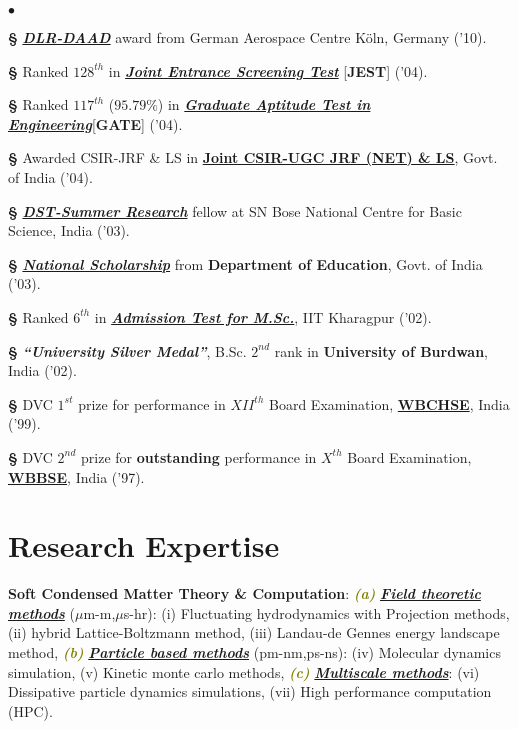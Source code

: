 \documentclass[margin,line]{res}
\newenvironment{list2}{
  \begin{list}{$\bullet$}{%
      \setlength{\itemsep}{0in}
      \setlength{\parsep}{0in} \setlength{\parskip}{0in}
      \setlength{\topsep}{0in} \setlength{\partopsep}{0in} 
      \setlength{\leftmargin}{0.2in}}}{\end{list}}
\begin{document}
\begin{resume}
\begin{list2}
\item[{\bf \S}] \href{https://www.daad.de/deutschland/stipendium/datenbank/en/15370-dlr-daad-research-fellowships-in-the-fields-of-space-aeronautics-energy-and-transportation-research/}{\textit{\textbf{DLR-DAAD}}} award from German Aerospace Centre K\"{o}ln, Germany ('10).
\item[{\bf \S}] Ranked {$128^{th}$} in \href{https://www.jest.org.in/}{\textit{\textbf{Joint Entrance Screening Test}}} [{\bf JEST}] ('04).
\item[{\bf \S}] Ranked {$117^{th}$} ($95.79\%$) in \href{https://en.wikipedia.org/wiki/Graduate_Aptitude_Test_in_Engineering}{\textit{\textbf{Graduate Aptitude Test in Engineering}}}[{\bf GATE}] ('04).
\item[{\bf \S}] Awarded {CSIR-JRF} \& {LS} in \href{http://csirhrdg.res.in/}{{\bf Joint CSIR-UGC JRF (NET) \& LS}}, Govt. of India ('04).
\item[{\bf \S}] \href{http://newweb.bose.res.in/LinkageProgrammes/VASP/Events.jsp}{\textit{\textbf{DST-Summer Research}}} fellow at {SN Bose 
                      National Centre for Basic Science}, India ('03). 
\item[{\bf \S}] \href{http://www.scholarships.gov.in/}{\textit{\textbf{National Scholarship}}} from {\bf Department of Education}, Govt. 
                      of India ('03).
\item[{\bf \S}] Ranked {$6^{th}$} in \href{https://en.wikipedia.org/wiki/Joint_Admission_Test_for_M.Sc.}{\textit{\textbf{Admission Test for M.Sc.}}}, 
      IIT Kharagpur ('02).
\item[{\bf \S}] {\textit{\textbf{``University Silver Medal''}}}, B.Sc. {$2^{nd}$} rank in {\bf University of Burdwan}, India ('02).
\item[{\bf \S}] DVC {$1^{st}$} prize for performance in $XII^{th}$ Board Examination, \href{http://wbchse.nic.in/html/index.html}{\bf WBCHSE}, 
                India ('99). 
\item[{\bf \S}] DVC {$2^{nd}$} prize for {\bf outstanding} performance in $X^{th}$ Board Examination, \href{http://wbbse.org/}{\bf WBBSE}, 
                India ('97).
\end{list2}
\vspace{1mm}

\section{\sc Research Expertise}
{{\bf Soft Condensed Matter Theory \& Computation}: 
\textcolor{olive}{\textit{\textbf{(a)}}}} \textcolor{alizarin}{\ul{\textit{\textbf{Field theoretic methods}}}} ($\mu$m-m,$\mu$s-hr): 
(i) Fluctuating hydrodynamics with Projection methods, (ii) hybrid Lattice-Boltzmann method, (iii) Landau-de Gennes energy landscape 
method, \textcolor{olive}{\textit{\textbf{(b)}}} \textcolor{alizarin}{\ul{\textbf{\textit{Particle based methods}}}} (pm-nm,ps-ns): (iv) 
Molecular dynamics simulation, (v) Kinetic monte carlo methods, \textcolor{olive}{\textit{\textbf{(c)}}} 
\textcolor{alizarin}{\ul{\textbf{\textit{Multiscale methods}}}}: (vi) Dissipative particle dynamics simulations, 
(vii) High performance computation (HPC).
\vspace{1mm}


\end{resume}
\end{document}
